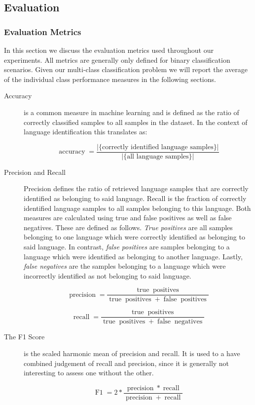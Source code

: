 \subsection{Evaluation} 

\subsubsection{Evaluation Metrics} 
\label{sec:metrics}
In this section we discuss the evaluation metrics used throughout our experiments. All metrics are generally only defined for binary classification scenarios. Given our multi-class classification problem we will report the average of the individual class performance measures in the following sections. 

\begin{description}
    \item[Accuracy] is a common measure in machine learning and is defined as the ratio of correctly classified samples to all samples in the dataset. In the context of language identification this translates as:
     

	$$
	\operatorname{accuracy} = \frac{
	   \vert \{ \text{correctly identified language samples} \} \vert
	  }{
	   \vert \{ \text{all language samples} \} \vert
	  }
	$$
     
    
    \item[Precision and Recall] Precision defines the ratio of retrieved language samples that are correctly identified as belonging to said language. Recall is the fraction of correctly identified language samples to all samples belonging to this language. Both measures are calculated using true and false positives as well as false negatives. These are defined as follows. \textit{True positives} are all samples belonging to one language which were correctly identified as belonging to said language. In contrast, \textit{false positives} are samples belonging to a language which were identified as belonging to another language. Lastly, \textit{false negatives} are the samples belonging to a language which were incorrectly identified as not belonging to said language.

	    $$
	    \operatorname{precision} = \frac
	      {\operatorname{true} \operatorname{positives}}
	      {\operatorname{true} \operatorname{positives} + \operatorname{false} \operatorname{positives}}
	    $$
		
		$$
		\operatorname{recall} = \frac
			{\operatorname{true} \operatorname{positives}}
			{\operatorname{true} \operatorname{positives} + \operatorname{false} \operatorname{negatives}}
		$$    


    \item[The F1 Score] is the scaled harmonic mean of precision and recall. It is used to a have combined judgement of recall and precision, since it is generally not interesting to assess one without the other.
    
    	$$
    	\operatorname{F1} = 2 * \frac{\operatorname{precision} * \operatorname{recall}}{\operatorname{precision} + \operatorname{recall}}
    	$$

\end{description}

